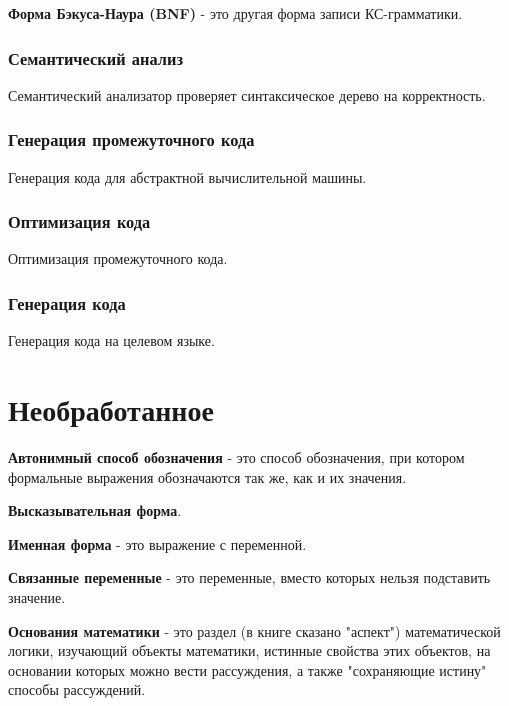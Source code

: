 \documentclass[oneside]{book}
\begin{document}
    \textbf{Форма Бэкуса-Наура (BNF)} - это другая форма записи КС-грамматики.

    \subsection{Семантический анализ}
    Семантический анализатор проверяет синтаксическое дерево на корректность.

    \subsection{Генерация промежуточного кода}
    Генерация кода для абстрактной вычислительной машины.

    \subsection{Оптимизация кода}
    Оптимизация промежуточного кода.

    \subsection{Генерация кода}
    Генерация кода на целевом языке.

    \chapter{Необработанное}
    \textbf{Автонимный способ обозначения} - это
    способ обозначения,
    при котором формальные выражения обозначаются так же,
    как и их значения.

    \textbf{Высказывательная форма}.

    \textbf{Именная форма} - это
    выражение с переменной.

    \textbf{Связанные переменные} - это
    переменные, вместо которых
    нельзя подставить значение.

    \textbf{Основания математики} - это
    раздел (в книге сказано "аспект")
    математической логики,
    изучающий объекты математики,
    истинные свойства этих объектов,
    на основании которых можно вести рассуждения,
    а также "сохраняющие истину" способы рассуждений.
\end{document}
